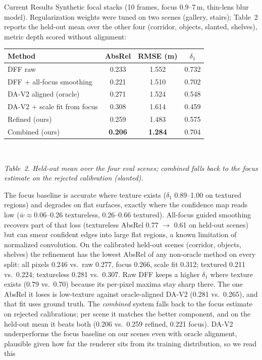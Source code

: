 \documentclass[11pt]{article}
\newcommand{\captext}[1]{{\fontsize{8.5}{10}\selectfont\itshape #1\par}}
\begin{document}
\begin{reportbox}{Current Results}
Synthetic focal stacks (10 frames, focus 0.9--7\,m, thin-lens blur
model). Regularization weights were tuned on two scenes (gallery,
stairs); Table~2 reports the held-out mean over the other four
(corridor, objects, slanted, shelves), metric depth scored without
alignment:
\begin{center}
\begin{tabular}{lccc}
\toprule
Method & AbsRel & RMSE (m) & $\delta_1$ \\
\midrule
DFF raw & 0.233 & 1.552 & 0.732 \\
DFF + all-focus smoothing & 0.221 & 1.510 & 0.702 \\
DA-V2 aligned (oracle) & 0.271 & 1.524 & 0.548 \\
DA-V2 + scale fit from focus & 0.308 & 1.614 & 0.459 \\
Refined (ours) & 0.259 & 1.483 & 0.575 \\
Combined (ours) & \textbf{0.206} & \textbf{1.284} & 0.704 \\
\bottomrule
\end{tabular}\\[2pt]
\captext{Table~2. Held-out mean over the four eval scenes; combined
falls back to the focus estimate on the rejected calibration
(slanted).}
\end{center}
The focus baseline is accurate where texture exists ($\delta_1$
0.89--1.00 on textured regions) and degrades on flat surfaces, exactly
where the confidence map reads low ($\bar w \approx
0.06$--0.26 textureless, 0.26--0.66 textured). All-focus guided
smoothing recovers part of that loss (textureless AbsRel 0.77 $\to$
0.61 on held-out scenes) but can smear confident edges into large flat
regions, a known limitation of normalized convolution. On the
calibrated held-out scenes (corridor, objects, shelves) the refinement
has the lowest AbsRel of any non-oracle method on every split: all
pixels 0.246 vs.\ raw 0.277, focus 0.266, scale fit 0.312; textured
0.211 vs.\ 0.224; textureless 0.281 vs.\ 0.307. Raw DFF keeps a higher
$\delta_1$ where texture exists (0.79 vs.\ 0.70) because its per-pixel
maxima stay sharp there. The one AbsRel it loses is low-texture
against oracle-aligned DA-V2 (0.281 vs.\ 0.265), and that fit uses
ground truth. The \emph{combined} system falls back to the focus
estimate on rejected calibrations; per scene it matches the better
component, and on the held-out mean it beats both (0.206 vs.\ 0.259
refined, 0.221 focus). DA-V2 underperforms the focus baseline on our
scenes even with oracle alignment, plausible given how far the
renderer sits from its training distribution, so we read this

\end{reportbox}
\end{document}
